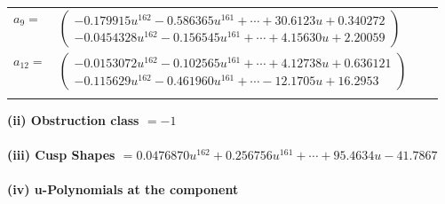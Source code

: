 \documentclass[1p]{elsarticle_modified}
\theoremstyle{definition}
\begin{document}
\begin{tabular}{m{7pt} m{180pt} m{7pt} m{180pt} }
\flushright $a_{9}=$&$\begin{pmatrix}-0.179915 u^{162}-0.586365 u^{161}+\cdots+30.6123 u+0.340272\\-0.0454328 u^{162}-0.156545 u^{161}+\cdots+4.15630 u+2.20059\end{pmatrix}$ \\
\flushright $a_{12}=$&$\begin{pmatrix}-0.0153072 u^{162}-0.102565 u^{161}+\cdots+4.12738 u+0.636121\\-0.115629 u^{162}-0.461960 u^{161}+\cdots-12.1705 u+16.2953\end{pmatrix}$\\&\end{tabular}
\flushleft \textbf{(ii) Obstruction class $= -1$}\\~\\
\flushleft \textbf{(iii) Cusp Shapes $= 0.0476870 u^{162}+0.256756 u^{161}+\cdots+95.4634 u-41.7867$}\\~\\
\newpage\renewcommand{\arraystretch}{1}
\flushleft \textbf{(iv) u-Polynomials at the component}\newline \\
\end{document}
